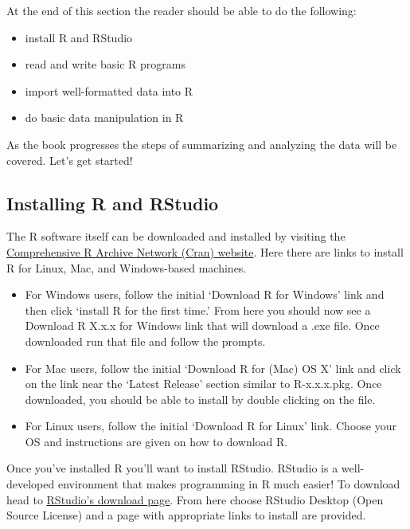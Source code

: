 \documentclass[
]{book}
\providecommand{\tightlist}{%
  \setlength{\itemsep}{0pt}\setlength{\parskip}{0pt}}
\theoremstyle{definition}
\theoremstyle{definition}
\theoremstyle{definition}
\theoremstyle{remark}
\begin{document}
At the end of this section the reader should be able to do the following:

\begin{itemize}
\tightlist
\item
  install R and RStudio\\
\item
  read and write basic R programs\\
\item
  import well-formatted data into R
\item
  do basic data manipulation in R
\end{itemize}

As the book progresses the steps of summarizing and analyzing the data will be covered. Let's get started!

\hypertarget{installing-r-and-rstudio}{%
\subsection{Installing R and RStudio}\label{installing-r-and-rstudio}}

The R software itself can be downloaded and installed by visiting the \href{https://cran.r-project.org/}{Comprehensive R Archive Network (Cran) website}. Here there are links to install R for Linux, Mac, and Windows-based machines.

\begin{itemize}
\item
  For Windows users, follow the initial `Download R for Windows' link and then click `install R for the first time.' From here you should now see a Download R X.x.x for Windows link that will download a .exe file. Once downloaded run that file and follow the prompts.
\item
  For Mac users, follow the initial `Download R for (Mac) OS X' link and click on the link near the `Latest Release' section similar to R-x.x.x.pkg. Once downloaded, you should be able to install by double clicking on the file.
\item
  For Linux users, follow the initial `Download R for Linux' link. Choose your OS and instructions are given on how to download R.
\end{itemize}

Once you've installed R you'll want to install RStudio. RStudio is a well-developed environment that makes programming in R much easier! To download head to \href{https://rstudio.com/products/rstudio/download/}{RStudio's download page}. From here choose RStudio Desktop (Open Source License) and a page with appropriate links to install are provided.
\end{document}

